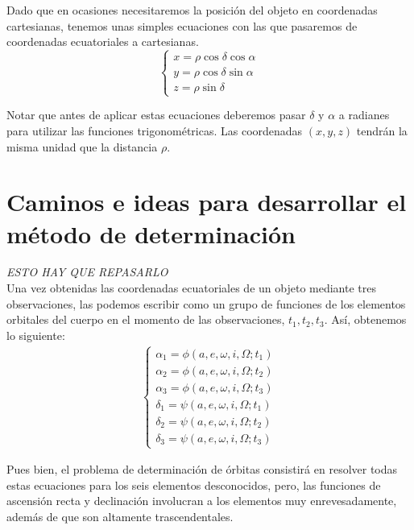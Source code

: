 \documentclass[11pt]{article}
\begin{document}
Dado que en ocasiones necesitaremos la posición del objeto en coordenadas cartesianas, tenemos unas simples ecuaciones con las que pasaremos de coordenadas ecuatoriales a cartesianas.
\[
\left\{
\begin{array}{l}
	x = \rho \cos{\delta}\cos{\alpha}\\
	y = \rho \cos{\delta}\sin{\alpha}\\
	z = \rho \sin{\delta}
\end{array}
\right.
\]

Notar que antes de aplicar estas ecuaciones deberemos pasar $\delta$ y $\alpha$ a radianes para utilizar las funciones trigonométricas. Las coordenadas $(x,y,z)$ tendrán la misma unidad que la distancia $\rho$.\\

\section{Caminos e ideas para desarrollar el método de determinación}
\label{sec:ideas_for_develope_method}

\textit{ESTO HAY QUE REPASARLO}\\

Una vez obtenidas las coordenadas ecuatoriales de un objeto mediante tres observaciones, las podemos escribir como un grupo de funciones de los elementos orbitales del cuerpo en el momento de las observaciones, $t_1, t_2, t_3$. Así, obtenemos lo siguiente:
\begin{align}
\left\{\begin{array}{l}
	\alpha_1 = \phi(a, e, \omega, i, \Omega; t_1)\\ 
	\alpha_2 = \phi(a, e, \omega, i, \Omega; t_2)\\ 
	\alpha_3 = \phi(a, e, \omega, i, \Omega; t_3)\\ 
	\delta_1 = \psi(a, e, \omega, i, \Omega; t_1)\\ 
	\delta_2 = \psi(a, e, \omega, i, \Omega; t_2)\\
	\delta_3 = \psi(a, e, \omega, i, \Omega; t_3)
\end{array}
\right.
\label{eq:ascension_declinacion}
\end{align}

Pues bien, el problema de determinación de órbitas consistirá en resolver todas estas ecuaciones para los seis elementos desconocidos, pero, las funciones de ascensión recta y declinación involucran a los elementos muy enrevesadamente, además de que son altamente trascendentales.\\
\end{document}
